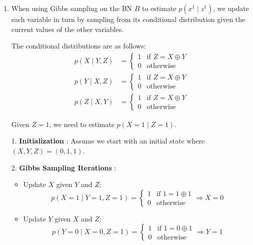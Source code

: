 \documentclass[a4 paper]{article}
\begin{document}
\begin{enumerate}
    \item {}
    
    When using Gibbs sampling on the BN \( B \) to estimate \( p(x^1 \mid z^1) \), we update each variable in turn by sampling from its 
    conditional distribution given the current values of the other variables.

    The conditional distributions are as follows:
    \[
    \begin{aligned}
        p(X \mid Y, Z) &= 
        \begin{cases} 
        1 & \text{if } Z = X \oplus Y \\
        0 & \text{otherwise} 
        \end{cases} \\
        p(Y \mid X, Z) &= 
        \begin{cases} 
        1 & \text{if } Z = X \oplus Y \\
        0 & \text{otherwise} 
        \end{cases} \\
        p(Z \mid X, Y) &= 
        \begin{cases} 
        1 & \text{if } Z = X \oplus Y \\
        0 & \text{otherwise} 
        \end{cases}
    \end{aligned}
    \]

    Given \( Z = 1 \), we need to estimate \( p(X = 1 \mid Z = 1) \).

    1. \textbf{Initialization} : Assume we start with an initial state where \( (X, Y, Z) = (0, 1, 1) \).

    2. \textbf{Gibbs Sampling Iterations} : 
    \begin{itemize}
        \item Update \( X \) given \( Y \) and \( Z \):
            \[
            p(X = 1 \mid Y = 1, Z = 1) = 
            \begin{cases} 
            1 & \text{if } 1 = 1 \oplus 1 \\ 
            0 & \text{otherwise} 
            \end{cases} \Rightarrow X = 0
            \]
        \item Update \( Y \) given \( X \) and \( Z \):
            \[
            p(Y = 0 \mid X = 0, Z = 1) = 
            \begin{cases} 
            1 & \text{if } 1 = 0 \oplus 1 \\
            0 & \text{otherwise}
            \end{cases} \Rightarrow Y = 1
            \]


\end{itemize}
\end{enumerate}
\end{document}
